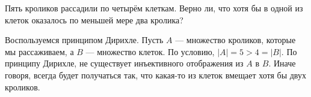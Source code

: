 \begin{task}{0}
Пять кроликов рассадили по четырём клеткам. Верно ли, что хотя бы в одной из клеток оказалось по меньшей мере два кролика?
\end{task}

\begin{solution}
Воспользуемся принципом Дирихле. Пусть $A$ --- множество кроликов, которые мы рассаживаем, а $B$ --- множество клеток. По условию, $|A|=5>4=|B|$. По принципу Дирихле, не существует инъективного отображения из $A$ в $B$. Иначе говоря, всегда будет получаться так, что какая-то из клеток вмещает хотя бы двух кроликов.
\end{solution}